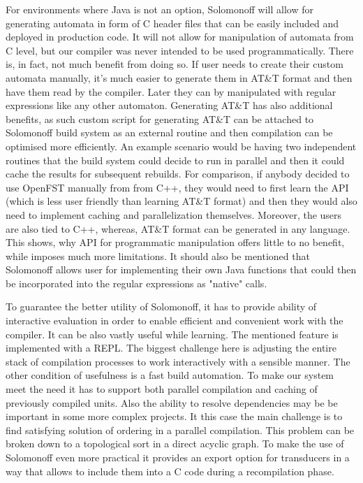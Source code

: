 For environments where Java is not an option, Solomonoff will allow for generating automata in form of C header files that can be easily included and deployed in production code. It will not allow for manipulation of automata from C level, but our compiler was never intended to be used programmatically. There is, in fact, not much benefit from doing so. If user needs to create their custom automata manually, it's much easier to generate them in AT\&T format  and then have them read by the compiler. Later they can by manipulated with regular expressions like any other automaton. Generating AT\&T has also additional benefits, as such custom script for generating AT\&T can be attached to Solomonoff build system as an external routine and then compilation can be optimised more efficiently. An example scenario would be having two independent routines that the build system could decide to run in parallel and then it could cache the results for subsequent rebuilds. For comparison, if anybody decided to use OpenFST manually from from C++, they would need to first learn the API (which is less user friendly than learning AT\&T format) and then they would also need to implement caching and parallelization themselves. Moreover, the users are also tied to C++, whereas, AT\&T format can be generated in any language. This shows, why API for programmatic  manipulation offers little to no benefit, while imposes much more limitations. It should also be mentioned that Solomonoff allows user for implementing their own Java functions that could then be incorporated into the regular expressions as "native" calls.

To guarantee the better utility of Solomonoff, it has to provide ability of interactive evaluation in order to enable efficient and convenient work with the compiler. It can be also vastly useful while learning. The mentioned feature is implemented with a REPL. The biggest challenge here is adjusting the entire stack of compilation processes to work interactively with a sensible manner. The other condition of usefulness is a fast build automation. To make our system meet the
need it has to support both parallel compilation and caching of previously compiled units. Also the ability to resolve dependencies may be be important in some more complex projects. It this case the main challenge is to find satisfying solution of ordering in a parallel compilation. This problem can be broken down to a topological sort in a direct acyclic graph.
To make the use of Solomonoff even more practical it provides an export option for transducers in a way that allows to include them into a C code during a recompilation phase. 

